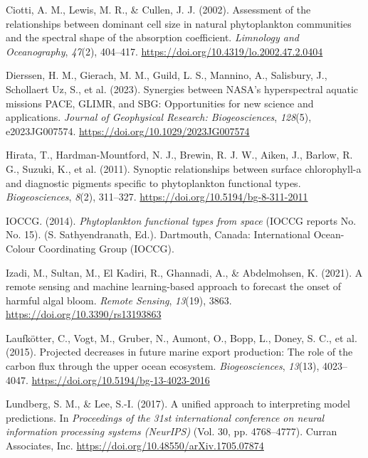 \documentclass[
]{agujournal2019}
\newlength{\cslhangindent}
\newenvironment{CSLReferences}[2] %
 {\begin{list}{}{%
  \setlength{\itemindent}{0pt}
  \setlength{\leftmargin}{0pt}
  \setlength{\parsep}{0pt}
  \ifodd #1
   \setlength{\leftmargin}{\cslhangindent}
   \setlength{\itemindent}{-1\cslhangindent}
  \fi
  \setlength{\itemsep}{#2\baselineskip}}}
 {\end{list}}
\begin{document}
\begin{CSLReferences}{1}{0}
Ciotti, A. M., Lewis, M. R., \& Cullen, J. J. (2002). Assessment of the
relationships between dominant cell size in natural phytoplankton
communities and the spectral shape of the absorption coefficient.
\emph{Limnology and Oceanography}, \emph{47}(2), 404--417.
\url{https://doi.org/10.4319/lo.2002.47.2.0404}

Dierssen, H. M., Gierach, M. M., Guild, L. S., Mannino, A., Salisbury,
J., Schollaert Uz, S., et al. (2023). Synergies between NASA's
hyperspectral aquatic missions PACE, GLIMR, and SBG: Opportunities for
new science and applications. \emph{Journal of Geophysical Research:
Biogeosciences}, \emph{128}(5), e2023JG007574.
\url{https://doi.org/10.1029/2023JG007574}

Hirata, T., Hardman-Mountford, N. J., Brewin, R. J. W., Aiken, J.,
Barlow, R. G., Suzuki, K., et al. (2011). Synoptic relationships between
surface chlorophyll-a and diagnostic pigments specific to phytoplankton
functional types. \emph{Biogeosciences}, \emph{8}(2), 311--327.
\url{https://doi.org/10.5194/bg-8-311-2011}

IOCCG. (2014). \emph{Phytoplankton functional types from space} (IOCCG
reports No. No. 15). (S. Sathyendranath, Ed.). Dartmouth, Canada:
International Ocean-Colour Coordinating Group (IOCCG).

Izadi, M., Sultan, M., El Kadiri, R., Ghannadi, A., \& Abdelmohsen, K.
(2021). A remote sensing and machine learning-based approach to forecast
the onset of harmful algal bloom. \emph{Remote Sensing}, \emph{13}(19),
3863. \url{https://doi.org/10.3390/rs13193863}

Laufkötter, C., Vogt, M., Gruber, N., Aumont, O., Bopp, L., Doney, S.
C., et al. (2015). Projected decreases in future marine export
production: The role of the carbon flux through the upper ocean
ecosystem. \emph{Biogeosciences}, \emph{13}(13), 4023--4047.
\url{https://doi.org/10.5194/bg-13-4023-2016}

Lundberg, S. M., \& Lee, S.-I. (2017). A unified approach to
interpreting model predictions. In \emph{Proceedings of the 31st
international conference on neural information processing systems
(NeurIPS)} (Vol. 30, pp. 4768--4777). Curran Associates, Inc.
\url{https://doi.org/10.48550/arXiv.1705.07874}


\end{CSLReferences}
\end{document}
